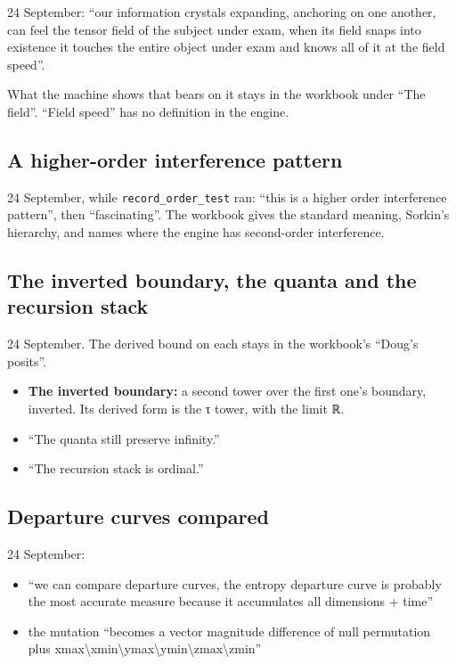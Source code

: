 24 September: “our information crystals expanding, anchoring on one another, can feel the tensor field of the subject under exam, when its field snaps into existence it touches the entire object under exam and knows all of it at the field speed”.

What the machine shows that bears on it stays in the workbook under “The field”. “Field speed” has no definition in the engine.

\subsection{\texorpdfstring{A higher-order interference pattern}{A higher-order interference pattern}}

24 September, while \texttt{record\_\allowbreak{}order\_\allowbreak{}test} ran: “this is a higher order interference pattern”, then “fascinating”. The workbook gives the standard meaning, Sorkin's hierarchy, and names where the engine has second-order interference.

\subsection{\texorpdfstring{The inverted boundary, the quanta and the recursion stack}{The inverted boundary, the quanta and the recursion stack}}

24 September. The derived bound on each stays in the workbook's “Doug's posits”.

\begin{itemize}
\item \textbf{The inverted boundary:} a second tower over the first one's boundary, inverted. Its derived form is the τ tower, with the limit ℝ.
\item “The quanta still preserve infinity.”
\item “The recursion stack is ordinal.”
\end{itemize}

\subsection{\texorpdfstring{Departure curves compared}{Departure curves compared}}

24 September:

\begin{itemize}
\item “we can compare departure curves, the entropy departure curve is probably the most accurate measure because it accumulates all dimensions + time”
\item the mutation “becomes a vector magnitude difference of null permutation plus xmax\textbackslash{}xmin\textbackslash{}ymax\textbackslash{}ymin\textbackslash{}zmax\textbackslash{}zmin”
\end{itemize}

